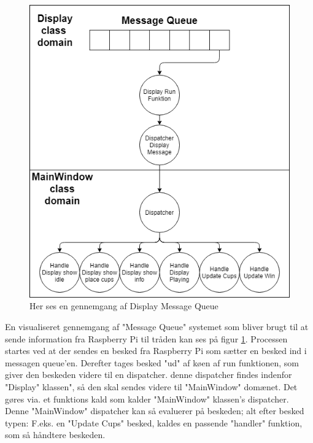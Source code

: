 \documentclass[Softwaredesign/Softwaredesign_main.tex]{subfiles}
\begin{document}
\begin{figure}[H]
    \centering
    \includegraphics[scale=0.5]{Softwaredesign/GUI/Pictures/Display_MsgQ.png}
    \caption{Her ses en gennemgang af Display Message Queue}
    \label{displaymsgq}
\end{figure}

En visualiseret gennemgang af "Message Queue" systemet som bliver brugt til at sende information fra Raspberry Pi til tråden kan ses på figur \ref{displaymsgq}. Processen startes ved at der sendes en besked fra Raspberry Pi som sætter en besked ind i messagen queue'en. Derefter tages besked "ud" af køen af run funktionen, som giver den beskeden videre til en dispatcher. denne dispatcher findes indenfor "Display" klassen", så den skal sendes videre til "MainWindow" domænet. Det gøres via. et funktions kald som kalder "MainWindow" klassen's dispatcher.  Denne "MainWindow" dispatcher kan så evaluerer på beskeden; alt efter besked typen: F.eks. en "Update Cups" besked, kaldes en passende "handler" funktion, som så håndtere beskeden. 
\end{document}
